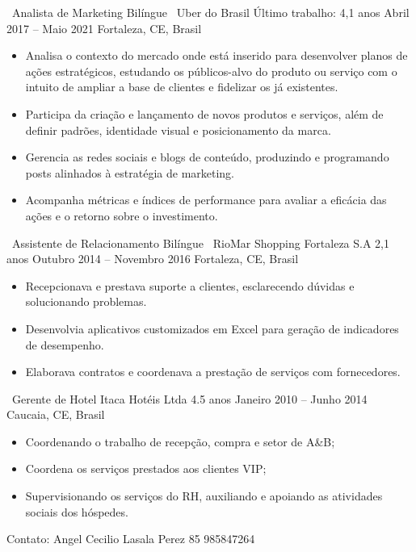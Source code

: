 \begin{commentA} \vspace{0.3cm} \noindent 
\cvevent
{\faPortrait\ Analista de Marketing Bilíngue}
{\faUber\ Uber do Brasil \hfill Último trabalho: 4,1 anos}
{Abril 2017 -- Maio 2021}
{Fortaleza, CE, Brasil}
\begin{itemize}[leftmargin=*,itemsep=0.5em,topsep=0.5em]
	\item Analisa o contexto do mercado onde está inserido para desenvolver planos de ações estratégicos, estudando os públicos-alvo do produto ou serviço com o intuito de ampliar a base de clientes e fidelizar os já existentes.
	\item Participa da criação e lançamento de novos produtos e serviços, além de definir padrões, identidade visual e posicionamento da marca.
	\item Gerencia as redes sociais e blogs de conteúdo, produzindo e programando posts alinhados à estratégia de marketing.
	\item Acompanha métricas e índices de performance para avaliar a eficácia das ações e o retorno sobre o investimento.
\end{itemize}
\divider
\cvevent
{\faShoppingBag\ Assistente de Relacionamento Bilíngue}
{\faShoppingBag\ RioMar Shopping Fortaleza S.A \hfill 2,1 anos}
{Outubro 2014 -- Novembro 2016}
{Fortaleza, CE, Brasil}
\begin{itemize}[leftmargin=*,itemsep=0.5em,topsep=0.5em]
	\item Recepcionava e prestava suporte a clientes, esclarecendo dúvidas e solucionando problemas.
	\item Desenvolvia aplicativos customizados em Excel para geração de indicadores de desempenho.
	\item Elaborava contratos e coordenava a prestação de serviços com fornecedores.
\end{itemize}
\divider
\cvevent
{\faPortrait ~Gerente de Hotel}
{\faHotel Itaca Hotéis Ltda \hfill 4.5 anos}
{Janeiro 2010 --  Junho 2014}
{Caucaia, CE, Brasil}
\begin{itemize}[leftmargin=*,itemsep=0.5em,topsep=0.5em]
	\item Coordenando o trabalho de recepção, compra e setor de A\&B;
	\item Coordena os serviços prestados aos clientes VIP;
	\item Supervisionando os serviços do RH, auxiliando e apoiando as atividades sociais dos hóspedes.
\end{itemize}
Contato: Angel Cecilio Lasala Perez 85 985847264
 \par \vspace{0.1cm}
\end{commentA}

